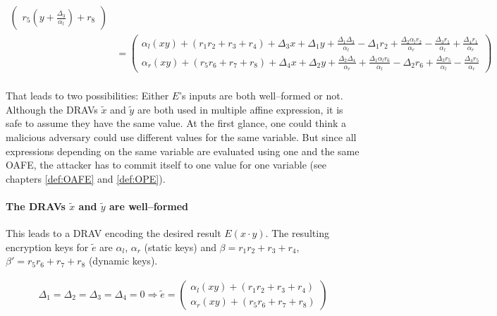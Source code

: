 \begin{align*}
\begin{pmatrix}
    r_5          \left(y + \frac{\Delta_3}{\alpha_l}\right) + r_8
  \end{pmatrix} \\
%
  & =
  \begin{pmatrix}
    \alpha_l(xy) + (r_1r_2 + r_3 + r_4)
    + \Delta_3x + \Delta_1y
    + \frac{\Delta_1\Delta_3}{\alpha_l}
    - \Delta_1r_2
    + \frac{\Delta_2\alpha_lr_2}{\alpha_r}
    - \frac{\Delta_3r_1}{\alpha_l}
    + \frac{\Delta_4r_1}{\alpha_r}
    \\
    \alpha_r(xy) + (r_5r_6 + r_7 + r_8)
    + \Delta_4x + \Delta_2y
    + \frac{\Delta_2\Delta_4}{\alpha_r}
    + \frac{\Delta_1\alpha_lr_6}{\alpha_l}
    - \Delta_2r_6
    + \frac{\Delta_3r_5}{\alpha_l}
    - \frac{\Delta_4r_5}{\alpha_r}
  \end{pmatrix} \\
%
\end{align*}

\noindent{}That leads to two possibilities: Either $E$'s inputs are both
well--formed or not.  Although the DRAVs $\widetilde{x}$ and $\widetilde{y}$ are
both used in multiple affine expression, it is safe to assume they have the same
value. At the first glance, one could think a malicious adversary could use
different values for the same variable. But since all expressions depending on
the same variable are evaluated using one and the same OAFE, the attacker has to
commit itself to one value for one variable (see chapters \ref{def:OAFE} and
\ref{def:OPE}).

\paragraph{The DRAVs $\widetilde{x}$ and $\widetilde{y}$ are well--formed}

This leads to a DRAV encoding the desired result $E(x \cdot y)$. The resulting
encryption keys for $\widetilde{e}$ are $\alpha_l$, $\alpha_r$ (static keys) and
$\beta = r_1r_2 + r_3 + r_4$, $\beta' = r_5r_6 + r_7 + r_8$ (dynamic keys).

\begin{align*}
  \Delta_1=\Delta_2=\Delta_3=\Delta_4=0 \Rightarrow
  \widetilde{e} =
  \begin{pmatrix}
    \alpha_l(xy) + (r_1r_2 + r_3 + r_4) \\
    \alpha_r(xy) + (r_5r_6 + r_7 + r_8)
  \end{pmatrix} \\
\end{align*}

